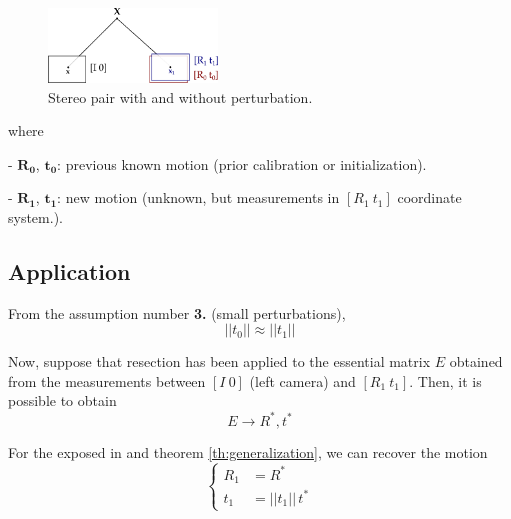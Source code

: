 \begin{figure}[!htbp]
 \centering
 \includegraphics[width=0.4\textwidth]{images/stereo01.pdf}
 \caption{Stereo pair with and without perturbation.}
 \label{fig:stereo}
\end{figure}
where
\begin{itemize*}
 \item[-] {\color{red} $\mathbf{R_0}$, $\mathbf{t_0}$}: previous known motion (prior calibration or initialization).

 \item[-] {\color{blue} $\mathbf{R_1}$, $\mathbf{t_1}$}: new motion (unknown, but measurements in $[R_1~t_1]$ coordinate system.).
\end{itemize*}


\subsection{Application}
From the assumption number \textbf{3.} (small perturbations),
\begin{equation}
\label{eq:aprox}
 ||t_0|| \approx ||t_1||
\end{equation}

\noindent
Now, suppose that resection has been applied to the essential matrix $E$ obtained from the measurements between $[I~0]$ (left camera) and $[R_1~t_1]$. Then,
it is possible to obtain
\begin{equation}
 E \rightarrow R^*, t^*
\end{equation}

\noindent
For the exposed in \cite{HZ2} and %
theorem \ref{th:generalization}, we can recover the motion
\begin{equation}
\left\{
  \begin{align}
  R_1 & = R^* \\
  t_1 & = ||t_1||\,t^*
  \end{align}
\right.
\end{equation}

